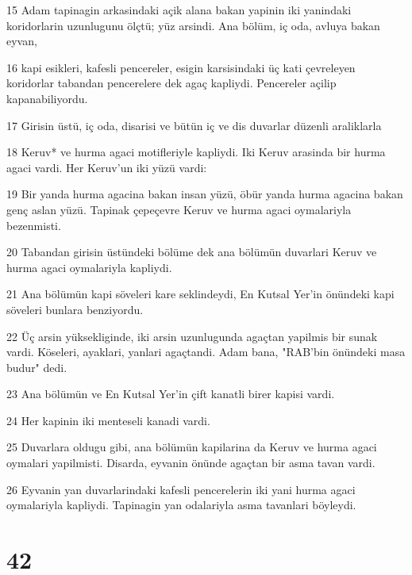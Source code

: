 \par 15 Adam tapinagin arkasindaki açik alana bakan yapinin iki yanindaki koridorlarin uzunlugunu ölçtü; yüz arsindi. Ana bölüm, iç oda, avluya bakan eyvan,
\par 16 kapi esikleri, kafesli pencereler, esigin karsisindaki üç kati çevreleyen koridorlar tabandan pencerelere dek agaç kapliydi. Pencereler açilip kapanabiliyordu.
\par 17 Girisin üstü, iç oda, disarisi ve bütün iç ve dis duvarlar düzenli araliklarla
\par 18 Keruv* ve hurma agaci motifleriyle kapliydi. Iki Keruv arasinda bir hurma agaci vardi. Her Keruv'un iki yüzü vardi:
\par 19 Bir yanda hurma agacina bakan insan yüzü, öbür yanda hurma agacina bakan genç aslan yüzü. Tapinak çepeçevre Keruv ve hurma agaci oymalariyla bezenmisti.
\par 20 Tabandan girisin üstündeki bölüme dek ana bölümün duvarlari Keruv ve hurma agaci oymalariyla kapliydi.
\par 21 Ana bölümün kapi söveleri kare seklindeydi, En Kutsal Yer'in önündeki kapi söveleri bunlara benziyordu.
\par 22 Üç arsin yüksekliginde, iki arsin uzunlugunda agaçtan yapilmis bir sunak vardi. Köseleri, ayaklari, yanlari agaçtandi. Adam bana, "RAB'bin önündeki masa budur" dedi.
\par 23 Ana bölümün ve En Kutsal Yer'in çift kanatli birer kapisi vardi.
\par 24 Her kapinin iki menteseli kanadi vardi.
\par 25 Duvarlara oldugu gibi, ana bölümün kapilarina da Keruv ve hurma agaci oymalari yapilmisti. Disarda, eyvanin önünde agaçtan bir asma tavan vardi.
\par 26 Eyvanin yan duvarlarindaki kafesli pencerelerin iki yani hurma agaci oymalariyla kapliydi. Tapinagin yan odalariyla asma tavanlari böyleydi.

\chapter{42}

